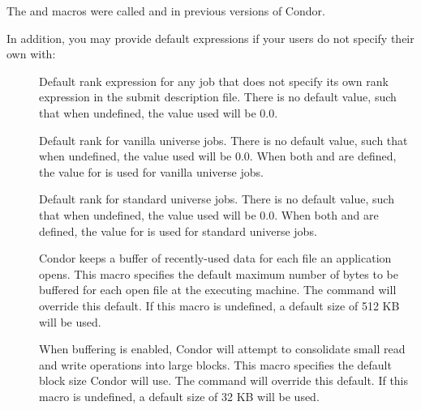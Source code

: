 \Note The  and 
 macros were called
 and
 in previous versions of Condor.

In addition, you may provide default  expressions if your users
do not specify their own with:

\begin{description}

\item[] \label{param:DefaultRank}
  Default rank expression for any job that does not specify
  its own rank expression in the submit description file.  
  There is no default value, such that when undefined,
  the value used will be 0.0.

\item[] \label{param:DefaultRankVanilla}
  Default rank for vanilla universe jobs.  
  There is no default value, such that when undefined,
  the value used will be 0.0.
  When both  and 
  are defined, the value for  is
  used for vanilla universe jobs.

\item[] \label{param:DefaultRankStandard}
  Default rank for standard universe jobs.
  There is no default value, such that when undefined,
  the value used will be 0.0.
  When both  and 
  are defined, the value for  is
  used for standard universe jobs.

\item[] \label{param:DefaultBufferSize}
  Condor keeps a buffer of recently-used data for each file an
  application opens.  This macro specifies the default maximum number
  of bytes to be buffered for each open file at the executing machine.
  The   command will override this
  default.  If this macro is undefined, a default size of 512 KB will
  be used.

\item[] 
  \label{param:DefaultBufferBlockSize} When buffering is enabled,
  Condor will attempt to consolidate small read and write operations
  into large blocks.  This macro specifies the default block size
  Condor will use.  The  
  command will override this default.  If this macro is undefined, a
  default size of 32 KB will be used.


\end{description}
